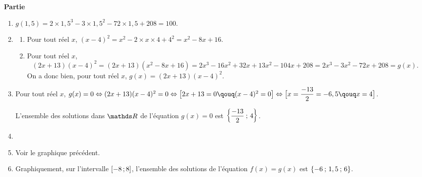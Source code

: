 \documentclass[10pt,french]{article}
\begin{document}
\medskip\textbf{Partie} 


\begin{enumerate}[label=\arabic*.]
    \item %
    $g(1,5)=2\times 1,5^3-3\times 1,5^2-72\times 1,5+208=100$.

    \item
        \begin{enumerate}[label=\alph*)]
        	\item Pour tout réel $x$, $(x-4)^2=x^2-2\times x\times 4+4^2=x^2-8x+16$.
        	
        	\item %
        	Pour tout réel $x$, \[(2x+13)(x-4)^2=(2x+13)(x^2-8x+16)=2x^3-16x^2+32x+13x^2-104x+208=2x^3-3x^2-72x+208=g(x).\]
        	On a donc bien, pour tout réel $x$, $g(x)=(2x+13)(x-4)^2$.
    	\end{enumerate}

    \item %
    Pour tout réel $x$, $g(x)=0\Leftrightarrow (2x+13)(x-4)^2=0\Leftrightarrow \big[ 2x+13=0\qouq (x-4)^2=0\big] \Leftrightarrow \big[ x=\dfrac{-13}{2}=-6,5\qouq x=4 \big]$.\par
    L'ensemble des solutions dans $\R$ de l'équation $g(x)=0$ est $\left\{\dfrac{-13}{2}\: ; \, 4\right\}$.

    \item\strut %


    \item Voir le graphique précédent.

    \item Graphiquement, sur l'intervalle $\left[-8\,;8\right]$, l'ensemble des solutions de l'équation $f(x)=g(x)$ est $\left\{-6\: ; \, 1,5\: ; \, 6\right\}$.
\end{enumerate}
\end{document}
